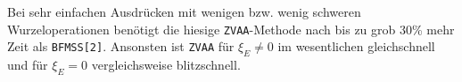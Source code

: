 \begin{remark}
Bei sehr einfachen Ausdrücken 
mit wenigen bzw. wenig schweren Wurzeloperationen 
benötigt die hiesige {\tt ZVAA}-Methode 
nach 
bis zu grob 30\% mehr Zeit als {\tt BFMSS[2]}.
Ansonsten ist {\tt ZVAA} für $\xi_E\ne0$ 
im wesentlichen gleichschnell
und für $\xi_E=0$ vergleichsweise blitzschnell.
\end{remark}

